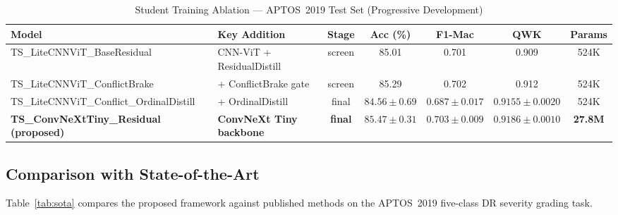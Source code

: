 \documentclass[10pt, twocolumn]{article}
\begin{document}
\begin{table}[t]
\centering
\caption{Student Training Ablation --- APTOS~2019 Test Set (Progressive Development)}
\label{tab:ablation}
\begin{tabular}{llccccc}
\toprule
\textbf{Model} & \textbf{Key Addition} & \textbf{Stage} & \textbf{Acc (\%)} & \textbf{F1-Mac} & \textbf{QWK} & \textbf{Params} \\
\midrule
TS\_LiteCNNViT\_BaseResidual & CNN-ViT + ResidualDistill & screen & 85.01 & 0.701 & 0.909 & 524K \\
TS\_LiteCNNViT\_ConflictBrake & + ConflictBrake gate & screen & 85.29 & 0.702 & 0.912 & 524K \\
TS\_LiteCNNViT\_Conflict\_OrdinalDistill & + OrdinalDistill & final & $84.56 \pm 0.69$ & $0.687 \pm 0.017$ & $0.9155 \pm 0.0020$ & 524K \\
\textbf{TS\_ConvNeXtTiny\_Residual (proposed)} & \textbf{ConvNeXt Tiny backbone} & \textbf{final} & $\mathbf{85.47 \pm 0.31}$ & $\mathbf{0.703 \pm 0.009}$ & $\mathbf{0.9186 \pm 0.0010}$ & \textbf{27.8M} \\
\bottomrule
\end{tabular}
\end{table}

\subsection{Comparison with State-of-the-Art}

Table~\ref{tab:sota} compares the proposed framework against published methods on
the APTOS~2019 five-class DR severity grading task.
\end{document}
